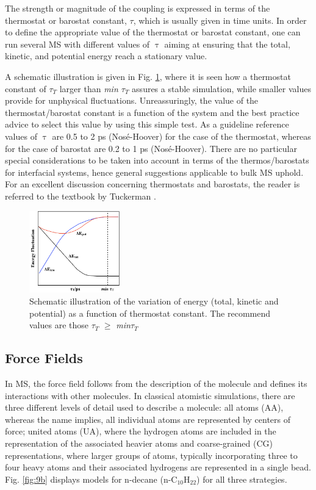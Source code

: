 \documentclass[9pt,bestpractices]{livecoms}
\begin{document}
The strength or magnitude of the coupling is expressed in terms of the
thermostat or barostat constant, {${\tau}$}, which is usually given in time
units. In order to define the appropriate value of the thermostat or barostat
constant, one can run several MS with different values of {${\uptau}$} aiming
at ensuring that the total, kinetic, and potential energy reach a stationary
value.

A schematic illustration is given in Fig. \ref{fig:5b}, where it is seen how a thermostat
constant of ${\tau}$$_{T}$ larger than \textit{min ${\tau}$}$_{T}$ assures
a stable simulation, while smaller values provide for unphysical fluctuations.
Unreassuringly, the value of the thermostat/barostat constant is a function of
the system and the best practice advice to select this value by using this
simple test. As a guideline reference values of {${\uptau}$} are 0.5 to 2 ps
(Nos\'{e}-Hoover) for the case of the thermostat, whereas for the case of
barostat are 0.2 to 1 ps (Nos\'{e}-Hoover). There are no particular special
considerations to be taken into account in terms of the thermos/barostats for
interfacial systems, hence general suggestions applicable to bulk MS uphold. For an excellent
discussion concerning thermostats and barostats, the reader is referred to the
textbook by Tuckerman \citep{tuckerman2010}.

\begin{figure}
\includegraphics[width=0.35\textwidth]{gfx/image25.png}
\caption{Schematic illustration of the variation of energy (total, kinetic and potential) as a function of thermostat constant. The recommend values are those ${\tau}$$_{ T}$ ${\geq}$ \textit{min${\tau}$}$_{T}$}
\label{fig:5b}
\end{figure}

\subsection{Force Fields}
\label{sec:forcefields}
In MS, the force field follows from the description of the molecule and defines
its interactions with other molecules. In classical atomistic simulations,
there are three different levels of detail used to describe a molecule: all
atoms (AA), whereas the name implies, all individual atoms are represented by
centers of force; united atoms (UA), where the hydrogen atoms are included in
the representation of the associated heavier atoms and coarse-grained (CG)
representations, where larger groups of atoms, typically incorporating three to
four heavy atoms and their associated hydrogens are represented in a single
bead. Fig. \ref{fig:9b} displays models for n-decane (n-C$_{10}$H$_{22}$) for all three strategies.
\end{document}
